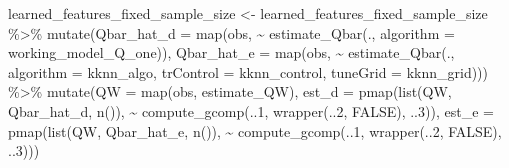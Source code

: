 \documentclass[
  11pt,
  openright,twoside]{book}
\newenvironment{Shaded}{\begin{snugshade}}{\end{snugshade}}
\newcommand{\AttributeTok}[1]{\textcolor[rgb]{0.77,0.63,0.00}{#1}}
\newcommand{\ConstantTok}[1]{\textcolor[rgb]{0.00,0.00,0.00}{#1}}
\newcommand{\DecValTok}[1]{\textcolor[rgb]{0.00,0.00,0.81}{#1}}
\newcommand{\FunctionTok}[1]{\textcolor[rgb]{0.00,0.00,0.00}{#1}}
\newcommand{\NormalTok}[1]{#1}
\newcommand{\OtherTok}[1]{\textcolor[rgb]{0.56,0.35,0.01}{#1}}
\newcommand{\SpecialCharTok}[1]{\textcolor[rgb]{0.00,0.00,0.00}{#1}}
\theoremstyle{definition}
\theoremstyle{definition}
\theoremstyle{definition}
\theoremstyle{definition}
\theoremstyle{remark}
\begin{document}
\begin{Shaded}
\begin{Highlighting}[]
\NormalTok{learned\_features\_fixed\_sample\_size }\OtherTok{\textless{}{-}}
\NormalTok{  learned\_features\_fixed\_sample\_size }\SpecialCharTok{\%\textgreater{}\%} 
  \FunctionTok{mutate}\NormalTok{(}\AttributeTok{Qbar\_hat\_d =}
           \FunctionTok{map}\NormalTok{(obs,}
               \SpecialCharTok{\textasciitilde{}} \FunctionTok{estimate\_Qbar}\NormalTok{(., }\AttributeTok{algorithm =}\NormalTok{ working\_model\_Q\_one)),}
         \AttributeTok{Qbar\_hat\_e =}
           \FunctionTok{map}\NormalTok{(obs,}
               \SpecialCharTok{\textasciitilde{}} \FunctionTok{estimate\_Qbar}\NormalTok{(., }\AttributeTok{algorithm =}\NormalTok{ kknn\_algo,}
                               \AttributeTok{trControl =}\NormalTok{ kknn\_control,}
                               \AttributeTok{tuneGrid =}\NormalTok{ kknn\_grid))) }\SpecialCharTok{\%\textgreater{}\%}
  \FunctionTok{mutate}\NormalTok{(}\AttributeTok{QW =} \FunctionTok{map}\NormalTok{(obs, estimate\_QW),}
         \AttributeTok{est\_d =}
           \FunctionTok{pmap}\NormalTok{(}\FunctionTok{list}\NormalTok{(QW, Qbar\_hat\_d, }\FunctionTok{n}\NormalTok{()),}
                \SpecialCharTok{\textasciitilde{}} \FunctionTok{compute\_gcomp}\NormalTok{(..}\DecValTok{1}\NormalTok{, }\FunctionTok{wrapper}\NormalTok{(..}\DecValTok{2}\NormalTok{, }\ConstantTok{FALSE}\NormalTok{), ..}\DecValTok{3}\NormalTok{)),}
         \AttributeTok{est\_e =}
           \FunctionTok{pmap}\NormalTok{(}\FunctionTok{list}\NormalTok{(QW, Qbar\_hat\_e, }\FunctionTok{n}\NormalTok{()),}
                \SpecialCharTok{\textasciitilde{}} \FunctionTok{compute\_gcomp}\NormalTok{(..}\DecValTok{1}\NormalTok{, }\FunctionTok{wrapper}\NormalTok{(..}\DecValTok{2}\NormalTok{, }\ConstantTok{FALSE}\NormalTok{), ..}\DecValTok{3}\NormalTok{)))}


\end{Highlighting}
\end{Shaded}
\end{document}
